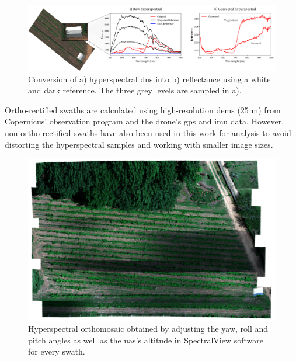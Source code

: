\begin{figure}[ht]
    \centering
    \includegraphics{figs/materials/spectral_view_rectification.png}
    \caption{Conversion of a) hyperspectral \acrshort{dn}s into b) reflectance using a white and dark reference. The three grey levels are sampled in a).}
    \label{fig:hyperspectral_rectification}
\end{figure}

Ortho-rectified swaths are calculated using high-resolution \acrshort{dem}s (25 \si{\meter}) from Copernicus' observation program \cite{european_environment_agency_eu_2017} and the drone's \acrshort{gps} and \acrshort{imu} data. However, non-ortho-rectified swaths have also been used in this work for analysis to avoid distorting the hyperspectral samples and working with smaller image sizes.

\FloatBarrier
\begin{figure}[H]
    \centering
    \includegraphics[width=0.8\linewidth]{figs/materials/orthorectified_hyper.png}
    \caption{Hyperspectral orthomosaic obtained by adjusting the yaw, roll and pitch angles as well as the \acrshort{uas}'s altitude in SpectralView\texttrademark \hspace{1mm} software for every swath.}
    \label{fig:orthorectified_hyper}
\end{figure}

